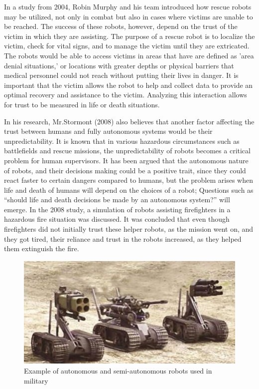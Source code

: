 \documentclass[runningheads,a4paper]{llncs}
\begin{document}
In a study from 2004, Robin Murphy and his team introduced how rescue robots may be utilized, not only in combat but also in cases where victims are unable to be reached\cite{murphy2004robot}.  The success of these robots, however, depend on the trust of the victim in which they are assisting.  The purpose of a rescue robot is to localize the victim, check for vital signs, and to manage the victim until they are extricated.  The robots would be able to access victims in areas that have are defined as 'area denial situations,' or locations with greater depths or physical barriers that medical personnel could not reach without putting their lives in danger.  It is important that the victim allows the robot to help and collect data to provide an optimal recovery and assistance to the victim.  Analyzing this interaction allows for trust to be measured in life or death situations.

In his research, Mr.Stormont (2008) also believes that another factor affecting the trust between humans and fully autonomous systems would be their unpredictability. It is known that in various hazardous circumstances such as battlefields and rescue missions, the unpredictability of robots becomes a critical problem for human supervisors. It has been argued that the autonomous nature of robots, and their decisions making could be a positive trait, since they could react faster to certain dangers compared to humans, but the problem arises when life and death of humans will depend on the choices of a robot; Questions such as ``should life and death decisions be made
by an autonomous system?'' will emerge. In the 2008 study, a simulation of robots assisting firefighters in a hazardous fire situation was discussed. It was concluded that even though firefighters did not initially trust these helper robots, as the mission went on, and they got tired, their reliance and trust in the robots increased, as they helped them extinguish the fire. 
\begin{figure}
	\centering
		\includegraphics[scale=0.6]{Figures/3robots.jpg}
	\caption{Example of autonomous and semi-autonomous robots used in military \cite{autonomousArmedRobots}}
	\label{MilitaryRobots}
\end{figure}
\end{document}
